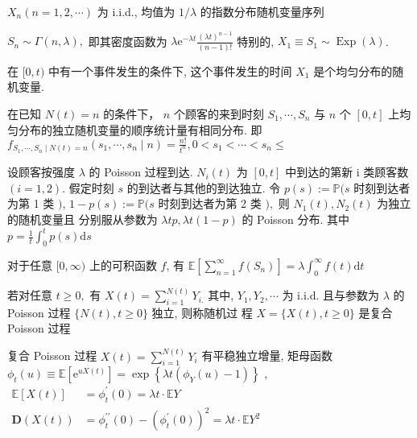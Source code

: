 \documentclass[10pt]{yerbaformat}
\begin{document}
\begin{lemma}[来到时间间隔分布]
    $X_{n}(n=1,2, \cdots)$ 为 i.i.d., 均值为 $1 / \lambda$ 的指数分布随机变量序列
\end{lemma}

\begin{lemma}[等待时间分布]
    $S_{n} \sim \Gamma(n, \lambda),$ 即其密度函数为 $\lambda \mathrm{e}^{-\lambda t} \frac{(\lambda t)^{n-1}}{(n-1) !}$ 特别的, $X_{1} \equiv S_{1} \sim \operatorname{Exp}(\lambda)$.
\end{lemma}

\begin{lemma}
    在 $[0, t)$ 中有一个事件发生的条件下, 这个事件发生的时间 $X_{1}$ 是个均匀分布的随机变量.
\end{lemma}

\begin{theorem}
    在已知 $N(t)=n$ 的条件下， $n$ 个顾客的来到时刻 $S_{1}, \cdots, S_{n}$ 与 $n$ 个 $[0, t]$ 上均匀分布的独立随机变量的顺序统计量有相同分布. 即 $f_{S_{1}, \cdots, S_{n} \mid N(t)=n}\left(s_{1}, \cdots, s_{n} \mid n\right)=\frac{n !}{t^{n}}, 0<s_{1}<\cdots<s_{n} \leq $
\end{theorem}

\begin{theorem}
    设顾客按强度 $\lambda$ 的 Poisson 过程到达. $N_{i}(t)$ 为 $[0, t]$ 中到达的第新 $\mathrm{i}$ 类顾客数 $(i=1,2) .$ 假定时刻 $s$ 的到达者与其他的到达独立. 令
$p(s):=\mathbb{P}(s$ 时刻到达者为第 1 类 $)$, $1-p(s):=\mathbb{P}(s$ 时刻到达者为第 2 类 $),$ 则 $N_{1}(t), N_{2}(t)$ 为独立的随机变量且 分别服从参数为 $\lambda t p, \lambda t(1-p)$ 的 Poisson 分布. 其中 $p=\frac{1}{t} \int_{0}^{t} p(s) \mathrm{d} s$
\end{theorem}

\begin{lemma}
    对于任意 $[0, \infty)$ 上的可积函数 $f$, 有 $\mathbb{E}\left[\sum_{n=1}^{\infty} f\left(S_{n}\right)\right]=\lambda \int_{0}^{\infty} f(t) \mathrm{d} t$
\end{lemma}

\begin{definition}[复合 Poisson 过程]
    若对任意 $t \geq 0,$ 有 $X(t)=\sum_{i=1}^{N(t)} Y_{i .}$ 其中, $Y_{1}, Y_{2}, \cdots$ 为 i.i.d. 且与参数为 $\lambda$ 的 Poisson 过程 $\{N(t), t \geq 0\}$ 独立, 则称随机过 程 $X=\{X(t), t \geq 0\}$ 是复合 Poisson 过程
\end{definition}

\begin{theorem}
    复合 Poisson 过程 $X(t)=\sum_{i=1}^{N(t)} Y_{i}$ 有平稳独立增量, 矩母函数 $\phi_{t}(u) \equiv \mathbb{E}\left[\mathrm{e}^{u X(t)}\right]=\exp \left\{\lambda t\left(\phi_{Y}(u)-1\right)\right\}$ , $\begin{aligned} \mathbb{E}[X(t)] &=\phi_{t}^{\prime}(0)=\lambda t \cdot \mathbb{E} Y \\ \mathbf{D}(X(t)) &=\phi_{t}^{\prime \prime}(0)-\left(\phi_{t}^{\prime}(0)\right)^{2}=\lambda t \cdot \mathbb{E} Y^{2} \end{aligned}$
\end{theorem}
\end{document}
